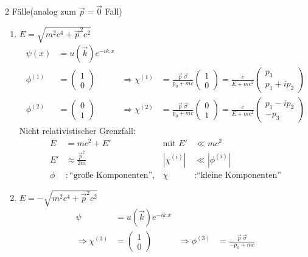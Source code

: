 2 Fälle(analog zum $\vec{p}= \vec{0}$ Fall)
	\begin{enumerate}[1.]
		\item $E= \sqrt{m^2c^4 + \vec{p}^2 c^2}$
		\begin{align*}
			\psi (x) &= u(\vec{k}) e^{-ik.x} \\
			\phi^{(1)} &= 
			\begin{pmatrix}
			1 \\ 0
			\end{pmatrix}
			&\Rightarrow 
			\chi^{(1)} &= \frac{\vec{p}~\vec{\sigma}}{p_0 + mc}
			\begin{pmatrix}
			1 \\ 0
			\end{pmatrix}
			= \frac{c}{E + mc^2}
			\begin{pmatrix}
			p_3 \\ p_1 + ip_2
			\end{pmatrix} 
			\\
			\phi^{(2)} &= 
			\begin{pmatrix}
			0 \\ 1
			\end{pmatrix}
			&\Rightarrow 
			\chi^{(2)} &= \frac{\vec{p}~\vec{\sigma}}{p_0 + mc}
			\begin{pmatrix}
			0 \\ 1
			\end{pmatrix}
			= \frac{c}{E + mc^2}
			\begin{pmatrix}
			p_1 - ip_2 \\ -p_3
			\end{pmatrix}
		\end{align*}
	Nicht relativistischer Grenzfall:
		\begin{align*}
			E &= mc^2 + E' &\text{mit } E' &\ll mc^2 \\
			E' &\approx \frac{\vec{p}^2}{2m} &
			\left|\chi^{(i)} \right| &\ll \left|\phi^{(i)} \right| \\
			\phi &: \text{``große Komponenten''} ,& \chi &: \text{``kleine Komponenten''}
		\end{align*}
	\item $E=-\sqrt{m^2c^4 + \vec{p}^2 c^2}$
		\begin{align*}
			\psi &= u(\vec{k}) e^{-ik.x} \\
			\Rightarrow 
			\chi^{(3)} &= 
			\begin{pmatrix}
			1 \\ 0
			\end{pmatrix}
			&\Rightarrow 
			\phi^{(3)} &= \frac{\vec{p}~\vec{\sigma}}{-p_0 + mc}

\end{align*}
\end{enumerate}
